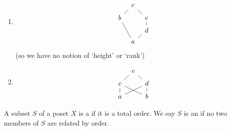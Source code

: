 \documentclass[a4paper, 10pt, twocolumn]{amsart}
\newcommand{\enumpre}{\vspace{-1.5\baselineskip}}
\begin{document}
\begin{example}~
  \enumpre
  \begin{enumerate}
    \item %
    \[\begin{tikzcd}[sep=tiny]
      & c \\
      b && e \\
      && d \\
      & a
      \arrow[no head, from=4-2, to=2-1]
      \arrow[no head, from=2-1, to=1-2]
      \arrow[no head, from=4-2, to=3-3]
      \arrow[no head, from=3-3, to=2-3]
      \arrow[no head, from=2-3, to=1-2]
    \end{tikzcd}\]
    (so we have no notion of `height' or `rank')
  \item %
  \[\begin{tikzcd}[sep=tiny]
    & e \\
    c && d \\
    a && b
    \arrow[no head, from=3-1, to=2-3]
    \arrow[no head, from=3-1, to=2-1]
    \arrow[no head, from=2-1, to=1-2]
    \arrow[no head, from=2-3, to=1-2]
    \arrow[no head, from=3-3, to=2-3]
    \arrow[no head, from=3-3, to=2-1]
  \end{tikzcd}\]
  \end{enumerate}
\end{example}

\begin{definition}[Chain]
  A subset $S$ of a poset $X$ is a  if it is a total order. 
  We say $S$ is an  if no two members of $S$ are related by order.
\end{definition}
\end{document}
